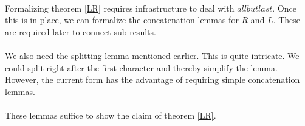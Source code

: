 \paragraph{}
Formalizing theorem \ref{LR} requires infrastructure to deal with $allbutlast$. 
Once this is in place, we can formalize the concatenation lemmas for $R$ and $L$.
These are required later to connect sub-results. 


\paragraph{}
We also need the splitting lemma mentioned earlier.
This is quite intricate. We could split right after the first character and thereby simplify the lemma. 
However, the current form has the advantage of requiring simple concatenation lemmas.


\paragraph{}
These lemmas suffice to show the claim of theorem \ref{LR}.


\paragraph{} 





